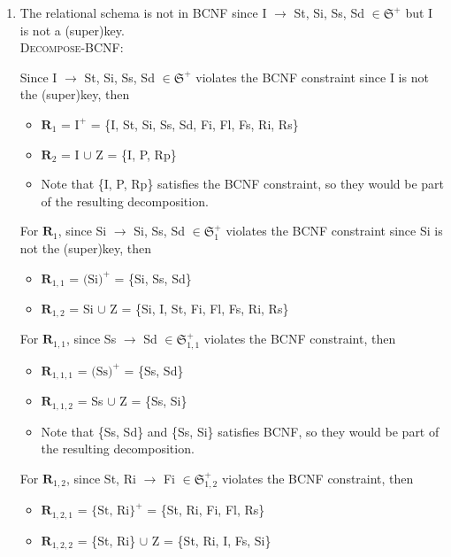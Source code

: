 \documentclass[12pt]{article}
\begin{document}
\begin{enumerate}
  \item The relational schema is not in BCNF since I $\longrightarrow$ St, Si,
        Ss, Sd $\in \mathfrak{S}^+$ but I is not a (super)key. \\

        \textsc{Decompose-BCNF}:

        Since I $\longrightarrow$ St, Si, Ss, Sd $\in \mathfrak{S}^+$ violates
        the BCNF constraint since I is not the (super)key, then
        \begin{itemize}
          \item $\textbf{R}_1$ = $\text{I}^+$ 
                               = \{I, St, Si, Ss, Sd, Fi, Fl, Fs, Ri, Rs\}
          \item $\textbf{R}_2$ = I $\cup$ Z
                               = \{I, P, Rp\}
          \item Note that \{I, P, Rp\} satisfies the BCNF constraint, so they
                would be part of the resulting decomposition.
        \end{itemize}

        For $\textbf{R}_1$, since Si $\longrightarrow$ Si, Ss, Sd $\in
        \mathfrak{S}_1^+$ violates the BCNF constraint since Si is not the
        (super)key, then
        \begin{itemize}
          \item $\textbf{R}_{1, 1}$ = $\text{(Si)}^+$
                                    = \{Si, Ss, Sd\}
          \item $\textbf{R}_{1, 2}$ = Si $\cup$ Z
                                    = \{Si, I, St, Fi, Fl, Fs, Ri, Rs\}
        \end{itemize}

        For $\textbf{R}_{1,1}$, since Ss $\longrightarrow$ Sd $\in
        \mathfrak{S}_{1,1}^+$ violates the BCNF constraint, then
        \begin{itemize}
          \item $\textbf{R}_{1,1,1}$ = $\text{(Ss)}^+$
                                     = \{Ss, Sd\}
          \item $\textbf{R}_{1,1,2}$ = Ss $\cup$ Z
                                     = \{Ss, Si\}
          \item Note that \{Ss, Sd\} and \{Ss, Si\} satisfies BCNF, so they
                would be part of the resulting decomposition.
        \end{itemize}

        For $\textbf{R}_{1,2}$, since St, Ri $\longrightarrow$ Fi $\in
        \mathfrak{S}_{1,2}^+$ violates the BCNF constraint, then
        \begin{itemize}
          \item $\textbf{R}_{1,2,1}$ = $\text{\{St, Ri\}}^+$
                                     = \{St, Ri, Fi, Fl, Rs\}
          \item $\textbf{R}_{1,2,2}$ = \{St, Ri\} $\cup$ Z
                                     = \{St, Ri, I, Fs, Si\}
        \end{itemize}


\end{enumerate}
\end{document}
